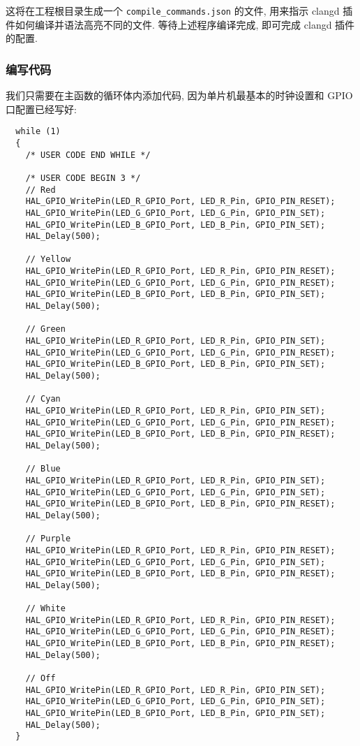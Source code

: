 这将在工程根目录生成一个 \texttt{compile\_commands.json} 的文件, 用来指示 clangd 插件如何编译并语法高亮不同的文件. 等待上述程序编译完成, 即可完成 clangd 插件的配置.

\subsubsection{编写代码}
我们只需要在主函数的循环体内添加代码, 因为单片机最基本的时钟设置和 GPIO 口配置已经写好:

\begin{verbatim}
  while (1)
  {
    /* USER CODE END WHILE */

    /* USER CODE BEGIN 3 */
    // Red
    HAL_GPIO_WritePin(LED_R_GPIO_Port, LED_R_Pin, GPIO_PIN_RESET);
    HAL_GPIO_WritePin(LED_G_GPIO_Port, LED_G_Pin, GPIO_PIN_SET);
    HAL_GPIO_WritePin(LED_B_GPIO_Port, LED_B_Pin, GPIO_PIN_SET);
    HAL_Delay(500);
    
    // Yellow
    HAL_GPIO_WritePin(LED_R_GPIO_Port, LED_R_Pin, GPIO_PIN_RESET);
    HAL_GPIO_WritePin(LED_G_GPIO_Port, LED_G_Pin, GPIO_PIN_RESET);
    HAL_GPIO_WritePin(LED_B_GPIO_Port, LED_B_Pin, GPIO_PIN_SET);
    HAL_Delay(500);

    // Green
    HAL_GPIO_WritePin(LED_R_GPIO_Port, LED_R_Pin, GPIO_PIN_SET);
    HAL_GPIO_WritePin(LED_G_GPIO_Port, LED_G_Pin, GPIO_PIN_RESET);
    HAL_GPIO_WritePin(LED_B_GPIO_Port, LED_B_Pin, GPIO_PIN_SET);
    HAL_Delay(500);

    // Cyan
    HAL_GPIO_WritePin(LED_R_GPIO_Port, LED_R_Pin, GPIO_PIN_SET);
    HAL_GPIO_WritePin(LED_G_GPIO_Port, LED_G_Pin, GPIO_PIN_RESET);
    HAL_GPIO_WritePin(LED_B_GPIO_Port, LED_B_Pin, GPIO_PIN_RESET);
    HAL_Delay(500);

    // Blue
    HAL_GPIO_WritePin(LED_R_GPIO_Port, LED_R_Pin, GPIO_PIN_SET);
    HAL_GPIO_WritePin(LED_G_GPIO_Port, LED_G_Pin, GPIO_PIN_SET);
    HAL_GPIO_WritePin(LED_B_GPIO_Port, LED_B_Pin, GPIO_PIN_RESET);
    HAL_Delay(500);

    // Purple
    HAL_GPIO_WritePin(LED_R_GPIO_Port, LED_R_Pin, GPIO_PIN_RESET);
    HAL_GPIO_WritePin(LED_G_GPIO_Port, LED_G_Pin, GPIO_PIN_SET);
    HAL_GPIO_WritePin(LED_B_GPIO_Port, LED_B_Pin, GPIO_PIN_RESET);
    HAL_Delay(500);

    // White
    HAL_GPIO_WritePin(LED_R_GPIO_Port, LED_R_Pin, GPIO_PIN_RESET);
    HAL_GPIO_WritePin(LED_G_GPIO_Port, LED_G_Pin, GPIO_PIN_RESET);
    HAL_GPIO_WritePin(LED_B_GPIO_Port, LED_B_Pin, GPIO_PIN_RESET);
    HAL_Delay(500);

    // Off
    HAL_GPIO_WritePin(LED_R_GPIO_Port, LED_R_Pin, GPIO_PIN_SET);
    HAL_GPIO_WritePin(LED_G_GPIO_Port, LED_G_Pin, GPIO_PIN_SET);
    HAL_GPIO_WritePin(LED_B_GPIO_Port, LED_B_Pin, GPIO_PIN_SET);
    HAL_Delay(500);
  }
\end{verbatim}


